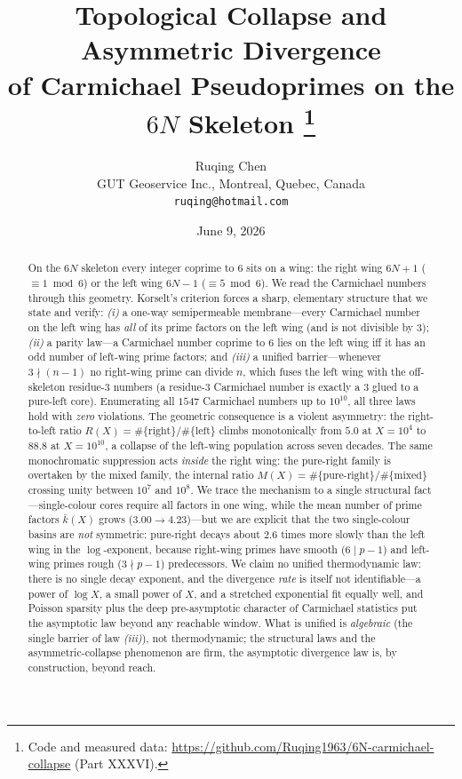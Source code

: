 \documentclass[11pt]{article}
\title{\bf Topological Collapse and Asymmetric Divergence\\
of Carmichael Pseudoprimes on the $6N$ Skeleton%
\thanks{Code and measured data: \url{https://github.com/Ruqing1963/6N-carmichael-collapse} (Part XXXVI).}}
\author{Ruqing Chen\\
\small GUT Geoservice Inc., Montreal, Quebec, Canada\\
\small \texttt{ruqing@hotmail.com}}
\date{June 9, 2026}
\theoremstyle{plain}
\theoremstyle{definition}
\begin{document}
\maketitle

\begin{abstract}
On the $6N$ skeleton every integer coprime to $6$ sits on a wing: the right wing $6N{+}1$
($\equiv1\bmod6$) or the left wing $6N{-}1$ ($\equiv5\bmod6$). We read the Carmichael numbers
through this geometry. Korselt's criterion forces a sharp, elementary structure that we state and
verify: \emph{(i)} a one-way semipermeable membrane---every Carmichael number on the left wing has
\emph{all} of its prime factors on the left wing (and is not divisible by $3$); \emph{(ii)} a
parity law---a Carmichael number coprime to $6$ lies on the left wing iff it has an odd number of
left-wing prime factors; and \emph{(iii)} a unified barrier---whenever $3\nmid(n-1)$ no right-wing
prime can divide $n$, which fuses the left wing with the off-skeleton residue-$3$ numbers (a
residue-$3$ Carmichael number is exactly a $3$ glued to a pure-left core). Enumerating all $1547$
Carmichael numbers up to $10^{10}$, all three laws hold with \emph{zero} violations. The geometric
consequence is a violent asymmetry: the right-to-left ratio $R(X)=\#\{\text{right}\}/\#\{\text{left}\}$
climbs monotonically from $5.0$ at $X=10^{4}$ to $88.8$ at $X=10^{10}$, a collapse of the left-wing
population across seven decades. The same monochromatic suppression acts \emph{inside} the right wing:
the pure-right family is overtaken by the mixed family, the internal ratio
$M(X)=\#\{\text{pure-right}\}/\#\{\text{mixed}\}$ crossing unity between $10^{7}$ and $10^{8}$. We trace
the mechanism to a single structural fact---single-colour cores require all factors in one wing, while
the mean number of prime factors $\bar k(X)$ grows ($3.00\to4.23$)---but we are explicit that the two
single-colour basins are \emph{not} symmetric: pure-right decays about $2.6$ times more slowly than the
left wing in the $\log$-exponent, because right-wing primes have smooth ($6\mid p-1$) and left-wing
primes rough ($3\nmid p-1$) predecessors. We claim no unified thermodynamic law: there is no single
decay exponent, and the divergence \emph{rate} is itself not identifiable---a power of $\log X$, a small
power of $X$, and a stretched exponential fit equally well, and Poisson sparsity plus the deep
pre-asymptotic character of Carmichael statistics put the asymptotic law beyond any reachable window.
What is unified is \emph{algebraic} (the single barrier of law \emph{(iii)}), not thermodynamic; the
structural laws and the asymmetric-collapse phenomenon are firm, the asymptotic divergence law is, by
construction, beyond reach.
\end{abstract}
\end{document}
